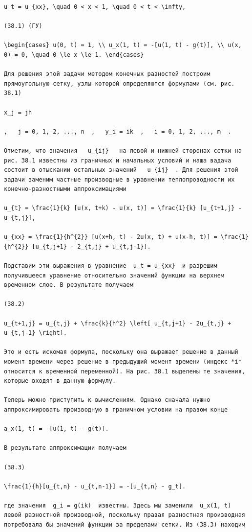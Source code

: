 \documentclass[
  ukrainian,
]{article}
\begin{document}
\begin{verbatim}
u_t = u_{xx}, \quad 0 < x < 1, \quad 0 < t < \infty,

(38.1) (ГУ)

\begin{cases} u(0, t) = 1, \\ u_x(1, t) = -[u(1, t) - g(t)], \\ u(x, 0) = 0, \quad 0 \le x \le 1. \end{cases}

Для решения этой задачи методом конечных разностей построим прямоугольную сетку, узлы которой определяются формулами (см. рис. 38.1)

x_j = jh

,   j = 0, 1, 2, ..., n  ,   y_i = ik  ,   i = 0, 1, 2, ..., m  .

Отметим, что значения   u_{ij}   на левой и нижней сторонах сетки на рис. 38.1 известны из граничных и начальных условий и наша вадача состоит в отыскании остальных значений   u_{ij}  . Для решения этой задачи заменим частные производные в уравнении теплопроводности их конечно-разностными аппроксимациями

u_{t} = \frac{1}{k} [u(x, t+k) - u(x, t)] = \frac{1}{k} [u_{t+1,j} - u_{t,j}],

u_{xx} = \frac{1}{h^{2}} [u(x+h, t) - 2u(x, t) + u(x-h, t)] = \frac{1}{h^{2}} [u_{t,j+1} - 2_{t,j} + u_{t,j-1}].

Подставим эти выражения в уравнение  u_t = u_{xx}  и разрешим получившееся уравнение относительно значений функции на верхнем временном слое. В результате получаем

(38.2) 

u_{t+1,j} = u_{t,j} + \frac{k}{h^2} \left[ u_{t,j+1} - 2u_{t,j} + u_{t,j-1} \right].

Это и есть искомая формула, поскольку она выражает решение в данный момент времени через решение в предыдущий момент времени (индекс *i* относится к временной переменной). На рис. 38.1 выделены те значения, которые входят в данную формулу.

Теперь можно приступить к вычислениям. Однако сначала нужно аппроксимировать производную в граничном условии на правом конце

a_x(1, t) = -[u(1, t) - g(t)].

В результате аппроксимации получаем

(38.3) 

\frac{1}{h}[u_{t,n} - u_{t,n-1}] = -[u_{t,n} - g_t].

где значения  g_i = g(ik)  известны. Здесь мы заменили  u_x(1, t)  левой разностной производной, поскольку правая разностная производная потребовала бы значений функции за пределами сетки. Из (38.3) находим


\end{verbatim}
\end{document}
